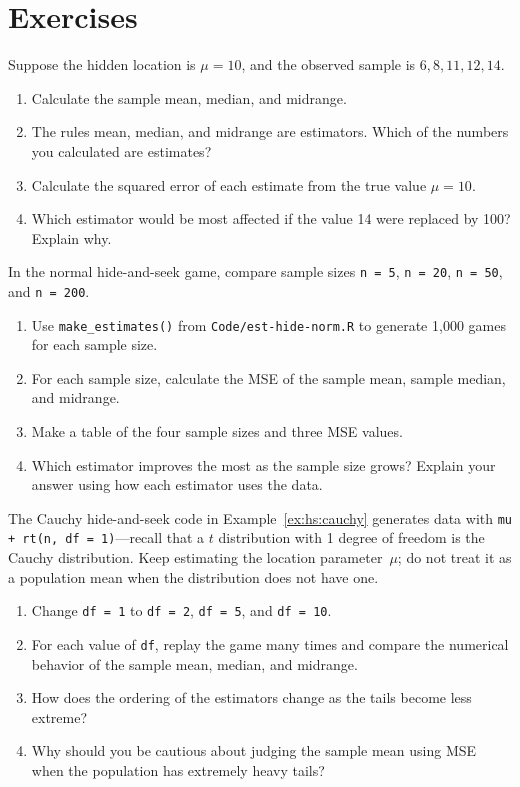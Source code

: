 \section{Exercises}

\begin{exercise}
Suppose the hidden location is $\mu = 10$, and the observed sample is
$6, 8, 11, 12, 14$.
\begin{enumerate}[label=(\alph*)]
\item Calculate the sample mean, median, and midrange.
\item The rules mean, median, and midrange are estimators. Which of
  the numbers you calculated are estimates?
\item Calculate the squared error of each estimate from the true value
  $\mu = 10$.
\item Which estimator would be most affected if the value 14 were
  replaced by 100? Explain why.
\end{enumerate}
\end{exercise}

\begin{exercise}
In the normal hide-and-seek game, compare sample sizes
\lstinline{n = 5}, \lstinline{n = 20}, \lstinline{n = 50}, and
\lstinline{n = 200}.
\begin{enumerate}[label=(\alph*)]
\item Use \lstinline{make_estimates()} from
  \lstinline{Code/est-hide-norm.R} to generate 1,000 games for each
  sample size.
\item For each sample size, calculate the MSE of the sample mean,
  sample median, and midrange.
\item Make a table of the four sample sizes and three MSE values.
\item Which estimator improves the most as the sample size grows?
  Explain your answer using how each estimator uses the data.
\end{enumerate}
\end{exercise}

\begin{exercise}
The Cauchy hide-and-seek code in Example~\ref{ex:hs:cauchy} generates
data with \lstinline{mu + rt(n, df = 1)}---recall that a $t$ distribution
with 1 degree of freedom is the Cauchy distribution. Keep estimating
the location parameter~$\mu$; do not treat it as a population mean when
the distribution does not have one.
\begin{enumerate}[label=(\alph*)]
\item Change \lstinline{df = 1} to \lstinline{df = 2},
  \lstinline{df = 5}, and \lstinline{df = 10}.
\item For each value of \lstinline{df}, replay the game many times and
  compare the numerical behavior of the sample mean, median, and
  midrange.
\item How does the ordering of the estimators change as the tails become
  less extreme?
\item Why should you be cautious about judging the sample mean using
  MSE when the population has extremely heavy tails?
\end{enumerate}
\end{exercise}

